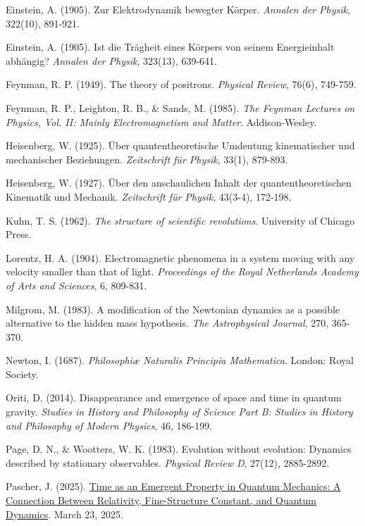 \documentclass[a4paper,12pt]{article}
\begin{document}
\begin{thebibliography}{99}
		 Einstein, A. (1905). Zur Elektrodynamik bewegter Körper. \textit{Annalen der Physik}, 322(10), 891-921.
		
		 Einstein, A. (1905). Ist die Trägheit eines Körpers von seinem Energieinhalt abhängig? \textit{Annalen der Physik}, 323(13), 639-641.
		
		 Feynman, R. P. (1949). The theory of positrons. \textit{Physical Review}, 76(6), 749-759.
		
		 Feynman, R. P., Leighton, R. B., \& Sands, M. (1985). \textit{The Feynman Lectures on Physics, Vol. II: Mainly Electromagnetism and Matter}. Addison-Wesley.
		
		 Heisenberg, W. (1925). Über quantentheoretische Umdeutung kinematischer und mechanischer Beziehungen. \textit{Zeitschrift für Physik}, 33(1), 879-893.
		
		 Heisenberg, W. (1927). Über den anschaulichen Inhalt der quantentheoretischen Kinematik und Mechanik. \textit{Zeitschrift für Physik}, 43(3-4), 172-198.
		
		 Kuhn, T. S. (1962). \textit{The structure of scientific revolutions}. University of Chicago Press.
		
		 Lorentz, H. A. (1904). Electromagnetic phenomena in a system moving with any velocity smaller than that of light. \textit{Proceedings of the Royal Netherlands Academy of Arts and Sciences}, 6, 809-831.
		
		 Milgrom, M. (1983). A modification of the Newtonian dynamics as a possible alternative to the hidden mass hypothesis. \textit{The Astrophysical Journal}, 270, 365-370.
		
		 Newton, I. (1687). \textit{Philosophiæ Naturalis Principia Mathematica}. London: Royal Society.
		
		 Oriti, D. (2014). Disappearance and emergence of space and time in quantum gravity. \textit{Studies in History and Philosophy of Science Part B: Studies in History and Philosophy of Modern Physics}, 46, 186-199.
		
		 Page, D. N., \& Wootters, W. K. (1983). Evolution without evolution: Dynamics described by stationary observables. \textit{Physical Review D}, 27(12), 2885-2892.
		
		 Pascher, J. (2025). \href{https://github.com/jpascher/T0-Time-Mass-Duality/tree/main/2/pdf/English/ZeitEmergentQMEn.pdf}{Time as an Emergent Property in Quantum Mechanics: A Connection Between Relativity, Fine-Structure Constant, and Quantum Dynamics}. March 23, 2025.
		

\end{thebibliography}
\end{document}
